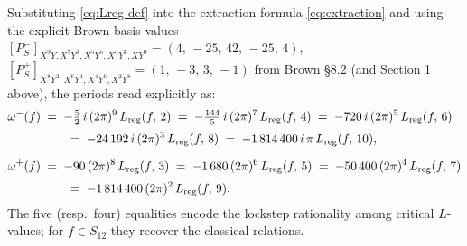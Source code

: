 \documentclass[11pt,letterpaper]{article}
\begin{document}
Substituting \eqref{eq:Lreg-def} into the extraction formula
\eqref{eq:extraction} and using the explicit Brown-basis values
\(
  [P^-_S]_{X^9Y, X^7Y^3, X^5Y^5, X^3Y^7, XY^9} = (4,\,-25,\,42,\,-25,\,4),
\)
\(
  [P^+_S]_{X^8Y^2, X^6Y^4, X^4Y^6, X^2Y^8} = (1,\,-3,\,3,\,-1)
\)
from Brown \cite{Brown2017} \S 8.2 (and Section 1 above), the periods read
explicitly as:
\begin{align}
  \omega^-(f)
   &\;=\; -\tfrac{5}{2}\,i\,(2\pi)^9\,L_{\rm reg}(f,\,2)
    \;=\; -\tfrac{144}{5}\,i\,(2\pi)^7\,L_{\rm reg}(f,\,4)
    \;=\; -720\,i\,(2\pi)^5\,L_{\rm reg}(f,\,6) \nonumber\\[2pt]
   &\phantom{\;=\;}\;\;
    \;=\; -24\,192\,i\,(2\pi)^3\,L_{\rm reg}(f,\,8)
    \;=\; -1\,814\,400\,i\,\pi\,L_{\rm reg}(f,\,10),
   \label{eq:omega-minus-explicit} \\[6pt]
  \omega^+(f)
   &\;=\; -90\,(2\pi)^8\,L_{\rm reg}(f,\,3)
    \;=\; -1\,680\,(2\pi)^6\,L_{\rm reg}(f,\,5)
    \;=\; -50\,400\,(2\pi)^4\,L_{\rm reg}(f,\,7) \nonumber\\[2pt]
   &\phantom{\;=\;}\;\;
    \;=\; -1\,814\,400\,(2\pi)^2\,L_{\rm reg}(f,\,9).
   \label{eq:omega-plus-explicit}
\end{align}
The five (resp.\ four) equalities encode the lockstep rationality among
critical $L$-values; for $f \in S_{12}$ they recover the classical
relations.
\end{document}
